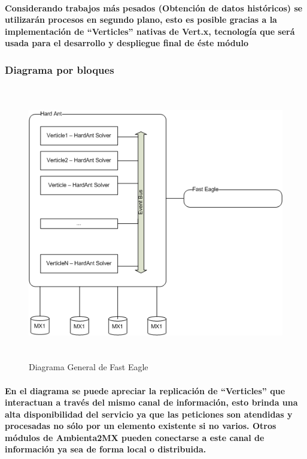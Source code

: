       \paragraph{Considerando trabajos más pesados (Obtención de datos históricos) se utilizarán procesos en segundo plano, esto es posible gracias a la implementación de ``Verticles'' nativas de Vert.x, tecnología que será usada para el desarrollo y despliegue final de éste módulo}
    \subsubsection{Diagrama por bloques}
      \newpage
        \begin{landscape}
          \begin{figure}[h!]
          \centering
          \includegraphics[width=22.5cm,height=12cm]{./images/DiagramaHardAnt.png}
          \caption{Diagrama General de Fast Eagle}
        \end{figure}
        \end{landscape}
      \newpage
    \paragraph{En el diagrama se puede apreciar la replicación de ``Verticles'' que interactuan a través del mismo canal de información, esto brinda una alta disponibilidad del servicio ya que las peticiones son atendidas y procesadas no sólo por un elemento existente si no varios. Otros módulos de Ambienta2MX pueden conectarse a este canal de información ya sea de forma local o distribuida.}
